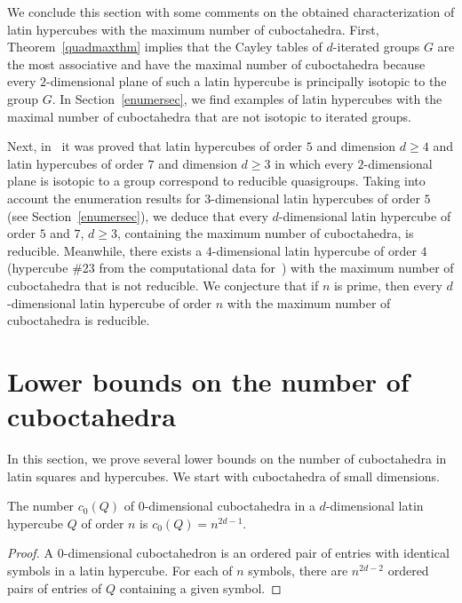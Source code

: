 \documentclass[a4paper]{article}
\begin{document}
We conclude this section with some comments on  the obtained characterization of latin hypercubes with the maximum number of cuboctahedra. First, Theorem~\ref{quadmaxthm} implies that the Cayley tables of $d$-iterated groups $G$ are the most associative and have the maximal number of cuboctahedra because every $2$-dimensional plane of such a latin hypercube is principally isotopic to the group $G$. In Section~\ref{enumersec}, we find examples of latin hypercubes with the maximal number of cuboctahedra that are not isotopic to iterated groups.  

Next, in~\cite[Corollary 2]{KrotPot.redquasi} it was proved that  latin hypercubes of order $5$ and dimension $d \geq 4$ and  latin hypercubes of order $7$ and dimension $d \geq 3$ in which every $2$-dimensional plane is isotopic to a group correspond to reducible quasigroups. Taking into account the enumeration results for $3$-dimensional latin hypercubes of order $5$ (see Section~\ref{enumersec}), we deduce that every $d$-dimensional latin hypercube of order $5$ and $7$, $ d \geq 3$, containing the maximum number of cuboctahedra, is reducible.  Meanwhile, there exists a $4$-dimensional latin hypercube of order $4$ (hypercube \#23 from the computational data for~\cite{KayWan.census}) with the maximum number of cuboctahedra that is not reducible.  We conjecture that if $n$ is prime, then  every $d$-dimensional latin hypercube of order $n$ with the maximum number of cuboctahedra is reducible.






\section{Lower bounds on the number of cuboctahedra} \label{lowboundsec}


In this section, we prove several lower bounds on the number of cuboctahedra in latin squares and hypercubes.  We start with  cuboctahedra of small dimensions. 

\begin{utv} \label{0dimcub}
The number $c_0 (Q)$ of $0$-dimensional cuboctahedra in a  $d$-dimensional latin hypercube $Q$ of order $n$ is $c_0(Q) = n^{2d - 1}$.
\end{utv}

\begin{proof}  
A $0$-dimensional cuboctahedron is an ordered pair of entries with identical symbols in a latin hypercube.  For each of $n$ symbols, there are $n^{2d-2}$ ordered pairs of entries of $Q$ containing a given symbol.
\end{proof}
\end{document}
